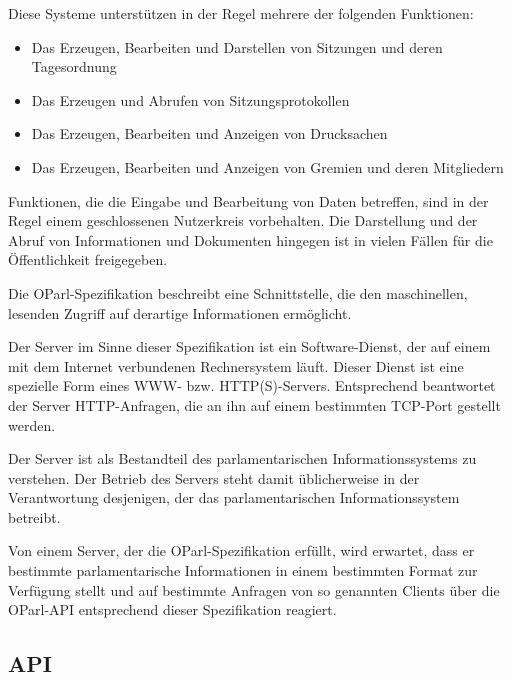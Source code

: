 \documentclass[,a4paper]{article}
\begin{document}
Diese Systeme unterstützen in der Regel mehrere der folgenden
Funktionen:

\begin{itemize}
\itemsep1pt\parskip0pt
\item
  Das Erzeugen, Bearbeiten und Darstellen von Sitzungen und deren
  Tagesordnung
\item
  Das Erzeugen und Abrufen von Sitzungsprotokollen
\item
  Das Erzeugen, Bearbeiten und Anzeigen von Drucksachen
\item
  Das Erzeugen, Bearbeiten und Anzeigen von Gremien und deren
  Mitgliedern
\end{itemize}

Funktionen, die die Eingabe und Bearbeitung von Daten betreffen, sind in
der Regel einem geschlossenen Nutzerkreis vorbehalten. Die Darstellung
und der Abruf von Informationen und Dokumenten hingegen ist in vielen
Fällen für die Öffentlichkeit freigegeben.

Die OParl-Spezifikation beschreibt eine Schnittstelle, die den
maschinellen, lesenden Zugriff auf derartige Informationen ermöglicht.


Der Server im Sinne dieser Spezifikation ist ein Software-Dienst, der
auf einem mit dem Internet verbundenen Rechnersystem läuft. Dieser
Dienst ist eine spezielle Form eines WWW- bzw. HTTP(S)-Servers.
Entsprechend beantwortet der Server HTTP-Anfragen, die an ihn auf einem
bestimmten TCP-Port gestellt werden.

Der Server ist als Bestandteil des parlamentarischen Informationssystems
zu verstehen. Der Betrieb des Servers steht damit üblicherweise in der
Verantwortung desjenigen, der das parlamentarischen Informationssystem
betreibt.

Von einem Server, der die OParl-Spezifikation erfüllt, wird erwartet,
dass er bestimmte parlamentarische Informationen in einem bestimmten
Format zur Verfügung stellt und auf bestimmte Anfragen von so genannten
Clients über die OParl-API entsprechend dieser Spezifikation reagiert.

\subsection{API}\label{api}
\end{document}
